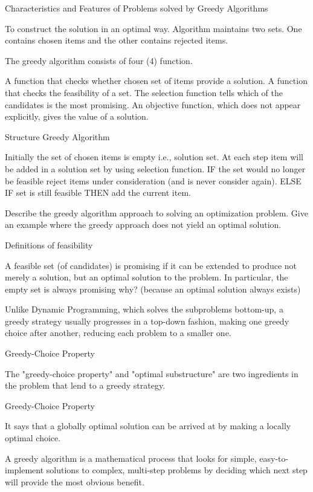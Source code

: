  

Characteristics and Features of Problems solved by Greedy Algorithms


To construct the solution in an optimal way. Algorithm maintains two sets. One contains chosen items and the other contains rejected items.

The greedy algorithm consists of four (4) function.

A function that checks whether chosen set of items provide a solution.
A function that checks the feasibility of a set.
The selection function tells which of the candidates is the most promising.
An objective function, which does not appear explicitly, gives the value of a solution.
 

Structure Greedy Algorithm

Initially the set of chosen items is empty i.e., solution set.
At each step
item will be added in a solution set by using selection function.
IF the set would no longer be feasible
reject items under consideration (and is never consider again).
ELSE IF set is still feasible THEN
add the current item.
 
Describe the greedy algorithm approach to solving an optimization problem.
Give an example where the greedy approach does not yield an optimal solution.



Definitions of feasibility

A feasible set (of candidates) is promising if it can be extended to produce not merely a solution, but an optimal solution to the problem. In particular, the empty set is always promising why? (because an optimal solution always exists)

Unlike Dynamic Programming, which solves the subproblems bottom-up, a greedy strategy usually progresses in a top-down fashion, making one greedy choice after another, reducing each problem to a smaller one. 

Greedy-Choice Property

The "greedy-choice property" and "optimal substructure" are two ingredients in the problem that lend to a greedy strategy.

Greedy-Choice Property

It says that a globally optimal solution can be arrived at by making a locally optimal choice.


A greedy algorithm is a mathematical process that looks for simple, easy-to-implement solutions to complex, multi-step problems by deciding which next step will provide the most obvious benefit.

